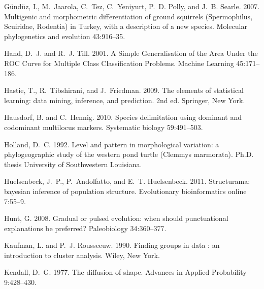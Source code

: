 \documentclass[12pt,letterpaper]{article}
\begin{document}
\begin{thebibliography}{77}
G\"{u}nd\"{u}z, I., M.~Jaarola, C.~Tez, C.~Yeniyurt, P.~D. Polly, and J.~B.
  Searle. 2007. {Multigenic and morphometric differentiation of ground
  squirrels (Spermophilus, Scuiridae, Rodentia) in Turkey, with a description
  of a new species.} Molecular phylogenetics and evolution 43:916--35.

Hand, D.~J. and R.~J. Till. 2001. {A Simple Generalisation of the Area Under
  the ROC Curve for Multiple Class Classification Problems}. Machine Learning
  45:171--186.

Hastie, T., R.~Tibshirani, and J.~Friedman. 2009. {The elements of statistical
  learning: data mining, inference, and prediction}. 2nd ed. Springer, New
  York.

Hausdorf, B. and C.~Hennig. 2010. {Species delimitation using dominant and
  codominant multilocus markers.} Systematic biology 59:491--503.

Holland, D.~C. 1992. {Level and pattern in morphological variation: a
  phylogeographic study of the western pond turtle (Clemmys marmorata)}. Ph.D.
  thesis University of Southwestern Louisiana.

Huelsenbeck, J.~P., P.~Andolfatto, and E.~T. Huelsenbeck. 2011. {Structurama:
  bayesian inference of population structure.} Evolutionary bioinformatics
  online 7:55--9.

Hunt, G. 2008. {Gradual or pulsed evolution: when should punctuational
  explanations be preferred?} Paleobiology 34:360--377.

Kaufman, L. and P.~J. Rousseeuw. 1990. {Finding groups in data : an
  introduction to cluster analysis}. Wiley, New York.

Kendall, D.~G. 1977. {The diffusion of shape}. Advances in Applied Probability
  9:428--430.


\end{thebibliography}
\end{document}
